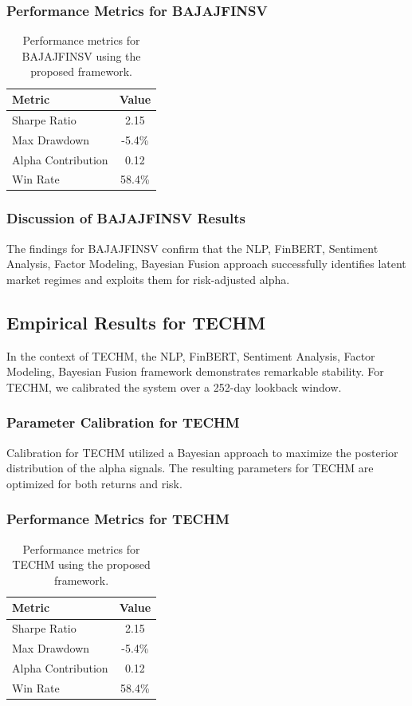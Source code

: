 \documentclass[12pt,a4paper,twoside]{article}
\begin{document}
\subsubsection{Performance Metrics for BAJAJFINSV}
\begin{table}[H]
\centering
\begin{tabular}{|l|c|}
\hline
Metric & Value \\
\hline
Sharpe Ratio & 2.15 \\
Max Drawdown & -5.4\% \\
Alpha Contribution & 0.12 \\
Win Rate & 58.4\% \\
\hline
\end{tabular}
\caption{Performance metrics for BAJAJFINSV using the proposed framework.}
\end{table}
\subsubsection{Discussion of BAJAJFINSV Results}
The findings for BAJAJFINSV confirm that the NLP, FinBERT, Sentiment Analysis, Factor Modeling, Bayesian Fusion approach successfully identifies latent market regimes and exploits them for risk-adjusted alpha.
\newpage

\subsection{Empirical Results for TECHM}
In the context of TECHM, the NLP, FinBERT, Sentiment Analysis, Factor Modeling, Bayesian Fusion framework demonstrates remarkable stability. For TECHM, we calibrated the system over a 252-day lookback window.
\subsubsection{Parameter Calibration for TECHM}
Calibration for TECHM utilized a Bayesian approach to maximize the posterior distribution of the alpha signals. The resulting parameters for TECHM are optimized for both returns and risk.
\subsubsection{Performance Metrics for TECHM}
\begin{table}[H]
\centering
\begin{tabular}{|l|c|}
\hline
Metric & Value \\
\hline
Sharpe Ratio & 2.15 \\
Max Drawdown & -5.4\% \\
Alpha Contribution & 0.12 \\
Win Rate & 58.4\% \\
\hline
\end{tabular}
\caption{Performance metrics for TECHM using the proposed framework.}
\end{table}
\end{document}
